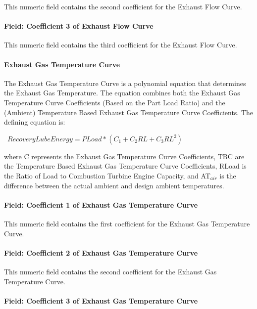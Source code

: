This numeric field contains the second coefficient for the Exhaust Flow Curve.

\paragraph{Field: Coefficient 3 of Exhaust Flow Curve}\label{field-coefficient-3-of-exhaust-flow-curve}

This numeric field contains the third coefficient for the Exhaust Flow Curve.

\paragraph{Exhaust Gas Temperature Curve}\label{exhaust-gas-temperature-curve}

The Exhaust Gas Temperature Curve is a polynomial equation that determines the Exhaust Gas Temperature. The equation combines both the Exhaust Gas Temperature Curve Coefficients (Based on the Part Load Ratio) and the (Ambient) Temperature Based Exhaust Gas Temperature Curve Coefficients. The defining equation is:

~\(RecoveryLubeEnergy = PLoad * ({C_1} + {C_2}RL + {C_3}R{L^2})\)

where C represents the Exhaust Gas Temperature Curve Coefficients, TBC are the Temperature Based Exhaust Gas Temperature Curve Coefficients, RLoad is the Ratio of Load to Combustion Turbine Engine Capacity, and AT\(_{air}\) is the difference between the actual ambient and design ambient temperatures.

\paragraph{Field: Coefficient 1 of Exhaust Gas Temperature Curve}\label{field-coefficient-1-of-exhaust-gas-temperature-curve}

This numeric field contains the first coefficient for the Exhaust Gas Temperature Curve.

\paragraph{Field: Coefficient 2 of Exhaust Gas Temperature Curve}\label{field-coefficient-2-of-exhaust-gas-temperature-curve}

This numeric field contains the second coefficient for the Exhaust Gas Temperature Curve.

\paragraph{Field: Coefficient 3 of Exhaust Gas Temperature Curve}\label{field-coefficient-3-of-exhaust-gas-temperature-curve}

